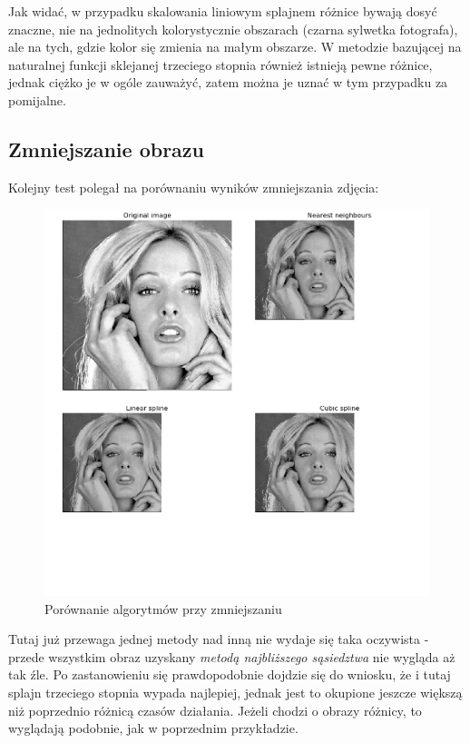 \documentclass{article}
\begin{document}
Jak widać, w przypadku skalowania liniowym splajnem różnice bywają dosyć znaczne, nie na jednolitych kolorystycznie obszarach (czarna sylwetka fotografa), ale na tych, gdzie kolor się zmienia na małym obszarze. W metodzie bazującej na naturalnej funkcji sklejanej trzeciego stopnia również istnieją pewne różnice, jednak ciężko je w ogóle zauważyć, zatem można je uznać w tym przypadku za pomijalne.

\subsection{Zmniejszanie obrazu}

Kolejny test polegał na porównaniu wyników zmniejszania zdjęcia:

\begin{figure}[ht]
    \centering
    \includegraphics[width=\textwidth]{images/woman-com.png}
    \caption{Porównanie algorytmów przy zmniejszaniu}
    \label{fig:woman-com}
\end{figure}

Tutaj już przewaga jednej metody nad inną nie wydaje się taka oczywista - przede wszystkim obraz uzyskany \textit{metodą najbliższego sąsiedztwa} nie wygląda aż tak źle. Po zastanowieniu się prawdopodobnie dojdzie się do wniosku, że i tutaj splajn trzeciego stopnia wypada najlepiej, jednak jest to okupione jeszcze większą niż poprzednio różnicą czasów działania. Jeżeli chodzi o obrazy różnicy, to wyglądają podobnie, jak w poprzednim przykładzie.
\end{document}
